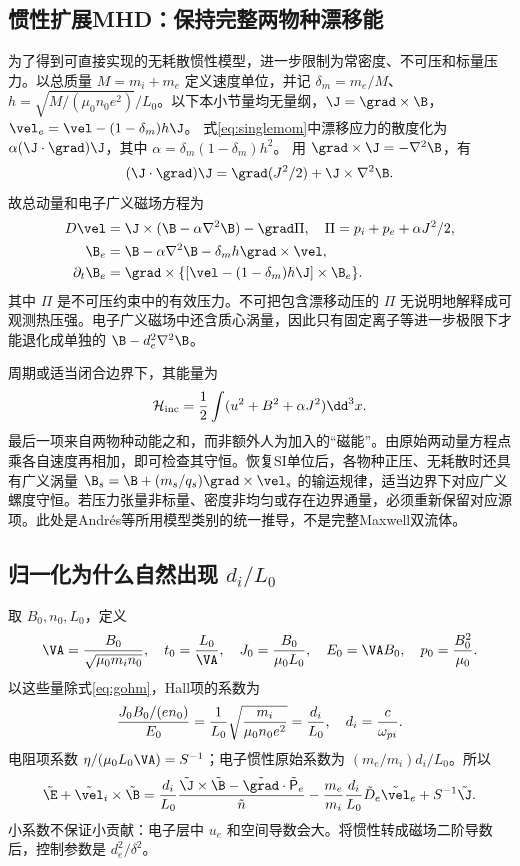 \subsection{惯性扩展MHD：保持完整两物种漂移能}
为了得到可直接实现的无耗散惯性模型，进一步限制为常密度、不可压和标量压力。以总质量 $M=m_i+m_e$ 定义速度单位，并记 $\delta_m=m_e/M$、$h=\sqrt{M/(\mu_0n_0e^2)}/L_0$。以下本小节量均无量纲，$\J=\grad\times\B$，$\vel_e=\vel-(1-\delta_m)h\J$。
式\eqref{eq:singlemom}中漂移应力的散度化为
$\alpha(\J\cdot\grad)\J$，其中 $\alpha=\delta_m(1-\delta_m)h^2$。
用 $\grad\times\J=-\nabla^2\B$，有
\begin{equation}
(\J\cdot\grad)\J=\grad(J^2/2)+\J\times\nabla^2\B.
\end{equation}
故总动量和电子广义磁场方程为
\begin{align}
D\vel&=\J\times(\B-\alpha\nabla^2\B)-\grad\Pi,
\quad\Pi=p_i+p_e+\alpha J^2/2,\\
\B_e&=\B-\alpha\nabla^2\B-\delta_mh\grad\times\vel,\\
\partial_t\B_e&=\grad\times\{[\vel-(1-\delta_m)h\J]\times\B_e\}.
\end{align}
其中 $\Pi$ 是不可压约束中的有效压力。不可把包含漂移动压的 $\Pi$ 无说明地解释成可观测热压强。电子广义磁场中还含质心涡量，因此只有固定离子等进一步极限下才能退化成单独的 $\B-d_e^2\nabla^2\B$。

周期或适当闭合边界下，其能量为
\begin{equation}
\mathcal H_{\rm inc}={1\over2}\int(u^2+B^2+\alpha J^2)\dd^3x.
\end{equation}
最后一项来自两物种动能之和，而非额外人为加入的“磁能”。由原始两动量方程点乘各自速度再相加，即可检查其守恒。恢复SI单位后，各物种正压、无耗散时还具有广义涡量
$\B_s=\B+(m_s/q_s)\grad\times\vel_s$ 的输运规律，适当边界下对应广义螺度守恒。若压力张量非标量、密度非均匀或存在边界通量，必须重新保留对应源项。此处是Andr\'es等所用模型类别的统一推导，不是完整Maxwell双流体。\citep{Andres2014,Andres2016}

\subsection{归一化为什么自然出现 $d_i/L_0$}
取 $B_0,n_0,L_0$，定义
\begin{equation}\VA={B_0\over\sqrt{\mu_0m_in_0}},\quad t_0={L_0\over\VA},\quad
J_0={B_0\over\mu_0L_0},\quad E_0=\VA B_0,\quad p_0={B_0^2\over\mu_0}.
\end{equation}
以这些量除式\eqref{eq:gohm}，Hall项的系数为
\begin{equation}{J_0B_0/(en_0)\over E_0}={1\over L_0}\sqrt{m_i\over\mu_0n_0e^2}={d_i\over L_0},\quad d_i={c\over\omega_{pi}}.
\end{equation}
电阻项系数 $\eta/(\mu_0L_0\VA)=S^{-1}$；电子惯性原始系数为 $(m_e/m_i)d_i/L_0$。所以
\begin{equation}\tilde\E+\tilde\vel_i\times\tilde\B={d_i\over L_0}{\tilde\J\times\tilde\B-\tilde\grad\cdot\tilde{\mathsf P}_e\over\tilde n}
-{m_e\over m_i}{d_i\over L_0}\tilde D_e\tilde\vel_e+S^{-1}\tilde\J.
\end{equation}
小系数不保证小贡献：电子层中 $u_e$ 和空间导数会大。将惯性转成磁场二阶导数后，控制参数是 $d_e^2/\delta^2$。

